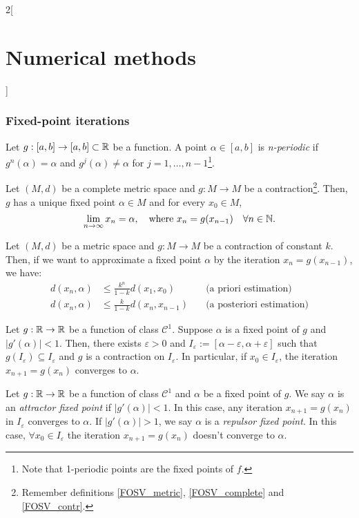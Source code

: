 \documentclass[../../../main.tex]{subfiles}
\begin{document}
\begin{multicols}{2}[\section{Numerical methods}]
\subsubsection*{Fixed-point iterations}
\begin{definition}
    Let $g:[a,b]\rightarrow[a,b]\subset\mathbb{R}$ be a function. A point $\alpha\in[a,b]$ is \textit{n-periodic} if $g^n(\alpha)=\alpha$ and $g^j(\alpha)\ne\alpha$ for $j=1,\ldots,n-1$\footnote{Note that 1-periodic points are the fixed points of $f$.}.
\end{definition}
\begin{theorem}
    Let $(M,d)$ be a complete metric space and $g:M\rightarrow M$ be a contraction\footnote{Remember definitions \ref{FOSV_metric}, \ref{FOSV_complete} and \ref{FOSV_contr}.}. Then, $g$ has a unique fixed point $\alpha\in M$ and for every $x_0\in M$, $$\lim_{n\to\infty}x_n=\alpha,\quad\text{where }x_n=g(x_{n-1})\quad\forall n\in\mathbb{N}.$$
\end{theorem}
\begin{prop}
    Let $(M,d)$ be a metric space and $g:M\rightarrow M$ be a contraction of constant $k$. Then, if we want to approximate a fixed point $\alpha$ by the iteration $x_n=g(x_{n-1})$, we have:
    \begin{align*}
        d(x_n,\alpha)&\leq\frac{k^n}{1-k}d(x_1,x_0)\quad&\text{(a priori estimation)}\\
        d(x_n,\alpha)&\leq\frac{k}{1-k}d(x_n,x_{n-1})\quad&\text{(a posteriori estimation)}
    \end{align*}
\end{prop}
\begin{corollary}
    Let $g:\mathbb{R}\rightarrow\mathbb{R}$ be a function of class $\mathcal{C}^1$. Suppose $\alpha$ is a fixed point of $g$ and $|g'(\alpha)|<1$. Then, there exists $\varepsilon>0$ and $I_\varepsilon:=[\alpha-\varepsilon,\alpha+\varepsilon]$ such that $g(I_\varepsilon)\subseteq I_\varepsilon$ and $g$ is a contraction on $I_\varepsilon$. In particular, if $x_0\in I_\varepsilon$, the iteration $x_{n+1}=g(x_n)$ converges to $\alpha$.
\end{corollary}
\begin{definition}
    Let $g:\mathbb{R}\rightarrow\mathbb{R}$ be a function of class $\mathcal{C}^1$ and $\alpha$ be a fixed point of $g$. We say $\alpha$ is an \textit{attractor fixed point} if $|g'(\alpha)|<1$. In this case, any iteration $x_{n+1}=g(x_n)$ in $I_\varepsilon$ converges to $\alpha$. If $|g'(\alpha)|>1$, we say $\alpha$ is a \textit{repulsor fixed point}. In this case, $\forall x_0\in I_\varepsilon$ the iteration $x_{n+1}=g(x_n)$ doesn't converge to $\alpha$.

\end{definition}
\end{multicols}
\end{document}
